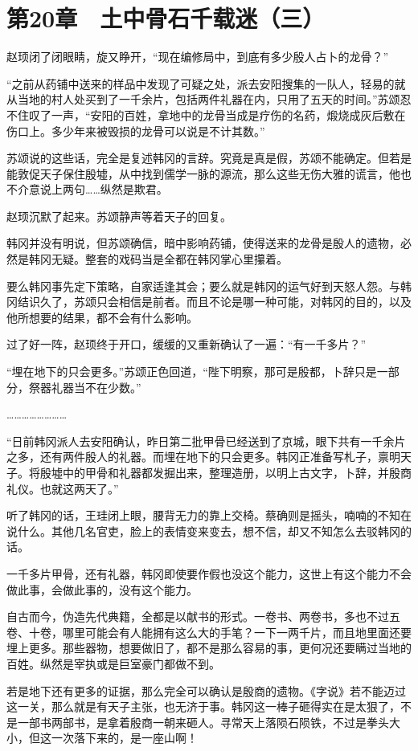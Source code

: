 \section{第20章　土中骨石千载迷（三）}

赵顼闭了闭眼睛，旋又睁开，“现在编修局中，到底有多少殷人占卜的龙骨？”

“之前从药铺中送来的样品中发现了可疑之处，派去安阳搜集的一队人，轻易的就从当地的村人处买到了一千余片，包括两件礼器在内，只用了五天的时间。”苏颂忍不住叹了一声，“安阳的百姓，拿地中的龙骨当成是疗伤的名药，煅烧成灰后敷在伤口上。多少年来被毁损的龙骨可以说是不计其数。”

苏颂说的这些话，完全是复述韩冈的言辞。究竟是真是假，苏颂不能确定。但若是能敦促天子保住殷墟，从中找到儒学一脉的源流，那么这些无伤大雅的谎言，他也不介意说上两句……纵然是欺君。

赵顼沉默了起来。苏颂静声等着天子的回复。

韩冈并没有明说，但苏颂确信，暗中影响药铺，使得送来的龙骨是殷人的遗物，必然是韩冈无疑。整套的戏码当是全都在韩冈掌心里攥着。

要么韩冈事先定下策略，自家适逢其会；要么就是韩冈的运气好到天怒人怨。与韩冈结识久了，苏颂只会相信是前者。而且不论是哪一种可能，对韩冈的目的，以及他所想要的结果，都不会有什么影响。

过了好一阵，赵顼终于开口，缓缓的又重新确认了一遍：“有一千多片？”

“埋在地下的只会更多。”苏颂正色回道，“陛下明察，那可是殷都，卜辞只是一部分，祭器礼器当不在少数。”

……………………

“日前韩冈派人去安阳确认，昨日第二批甲骨已经送到了京城，眼下共有一千余片之多，还有两件殷人的礼器。而埋在地下的只会更多。韩冈正准备写札子，禀明天子。将殷墟中的甲骨和礼器都发掘出来，整理造册，以明上古文字，卜辞，并殷商礼仪。也就这两天了。”

听了韩冈的话，王珪闭上眼，腰背无力的靠上交椅。蔡确则是摇头，喃喃的不知在说什么。其他几名官吏，脸上的表情变来变去，想不信，却又不知怎么去驳韩冈的话。

一千多片甲骨，还有礼器，韩冈即使要作假也没这个能力，这世上有这个能力不会做此事，会做此事的，没有这个能力。

自古而今，伪造先代典籍，全都是以献书的形式。一卷书、两卷书，多也不过五卷、十卷，哪里可能会有人能拥有这么大的手笔？一下一两千片，而且地里面还要埋上更多。那些器物，想要做旧了，都不是那么容易的事，更何况还要瞒过当地的百姓。纵然是宰执或是巨室豪门都做不到。

若是地下还有更多的证据，那么完全可以确认是殷商的遗物。《字说》若不能迈过这一关，那么就是有天子主张，也无济于事。韩冈这一棒子砸得实在是太狠了，不是一部书两部书，是拿着殷商一朝来砸人。寻常天上落陨石陨铁，不过是拳头大小，但这一次落下来的，是一座山啊！

